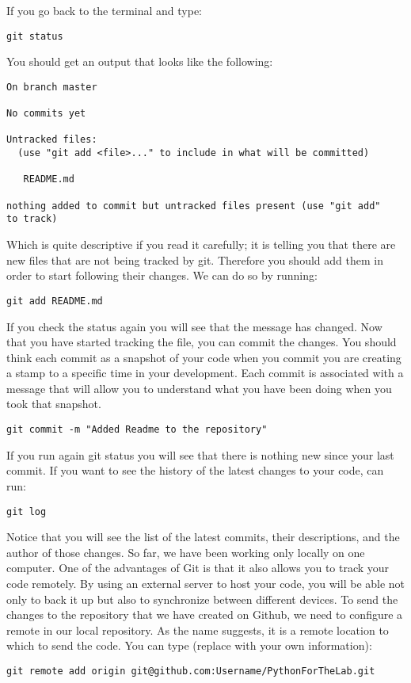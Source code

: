 If you go back to the terminal and type:
\begin{verbatim}
git status
\end{verbatim}

You should get an output that looks like the following:
\begin{verbatim}
On branch master

No commits yet

Untracked files:
  (use "git add <file>..." to include in what will be committed)

   README.md

nothing added to commit but untracked files present (use "git add" 
to track) 
\end{verbatim}

Which is quite descriptive if you read it carefully; it is telling you that there are new files that are not being tracked by git. Therefore you should add them in order to start following their changes. We can do so by running:
\begin{verbatim}
git add README.md 
\end{verbatim}

If you check the status again you will see that the message has changed. Now that you have started tracking the file, you can commit the changes. You should think each commit as a snapshot of your code when you commit you are creating a stamp to a specific time in your development. Each commit is associated with a message that will allow you to understand what you have been doing when you took that snapshot.
\begin{verbatim}
git commit -m "Added Readme to the repository" 
\end{verbatim}

If you run again git status you will see that there is nothing new since your last commit. If you want to see the history of the latest changes to your code, can run:
\begin{verbatim}
git log 
\end{verbatim}

Notice that you will see the list of the latest commits, their descriptions, and the author of those changes. So far, we have been working only locally on one computer. One of the advantages of Git is that it also allows you to track your code remotely. By using an external server to host your code, you will be able not only to back it up but also to synchronize between different devices. To send the changes to the repository that we have created on Github, we need to configure a remote in our local repository. As the name suggests, it is a remote location to which to send the code. You can type (replace with your own information):
\begin{verbatim}
git remote add origin git@github.com:Username/PythonForTheLab.git
\end{verbatim}

